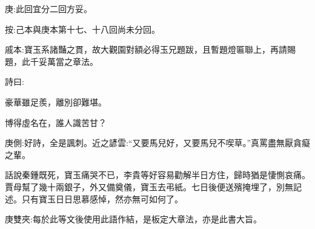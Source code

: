 
\begin{parag}
    \begin{note}庚:此回宜分二回方妥。\end{note}\begin{subnote}按:己本與庚本第十七、十八回尚未分回。\end{subnote}
\end{parag}


\begin{parag}
    \begin{note}戚本:寶玉系諸豔之貫，故大觀園對額必得玉兄題跋，且暫題燈匾聯上，再請賜題，此千妥萬當之章法。\end{note}
\end{parag}


\begin{parag}
    詩曰:
\end{parag}

\begin{poem}
    \begin{pl}豪華雖足羨，離別卻難堪。\end{pl}

    \begin{pl}博得虛名在，誰人識苦甘？\end{pl}
    \begin{note}庚側:好詩，全是諷刺。近之諺雲:“又要馬兒好，又要馬兒不喫草。”真罵盡無厭貪癡之輩。\end{note}
\end{poem}


\begin{parag}
    話說秦鍾既死，寶玉痛哭不已，李貴等好容易勸解半日方住，歸時猶是悽惻哀痛。賈母幫了幾十兩銀子，外又備奠儀，寶玉去弔紙。七日後便送殯掩埋了，別無記述。只有寶玉日日思慕感悼，然亦無可如何了。\begin{note}庚雙夾:每於此等文後使用此語作結，是板定大章法，亦是此書大旨。\end{note}
\end{parag}


